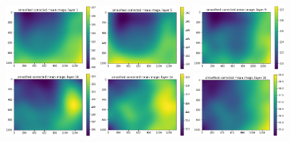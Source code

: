 \documentclass[letterpaper,11pt]{article}
\begin{document}
\begin{figure}[!ht]
\centering
\includegraphics[width=0.3\textwidth]{images/results/unmasked_smoothed_corrected_mean_image_layers_vectra/unmasked_smoothed_corrected_mean_image_layer_1}
\includegraphics[width=0.3\textwidth]{images/results/unmasked_smoothed_corrected_mean_image_layers_vectra/unmasked_smoothed_corrected_mean_image_layer_5}
\includegraphics[width=0.3\textwidth]{images/results/unmasked_smoothed_corrected_mean_image_layers_vectra/unmasked_smoothed_corrected_mean_image_layer_9}
\includegraphics[width=0.3\textwidth]{images/results/unmasked_smoothed_corrected_mean_image_layers_vectra/unmasked_smoothed_corrected_mean_image_layer_10}
\includegraphics[width=0.3\textwidth]{images/results/unmasked_smoothed_corrected_mean_image_layers_vectra/unmasked_smoothed_corrected_mean_image_layer_14}
\includegraphics[width=0.3\textwidth]{images/results/unmasked_smoothed_corrected_mean_image_layers_vectra/unmasked_smoothed_corrected_mean_image_layer_18}

\end{figure}
\end{document}

